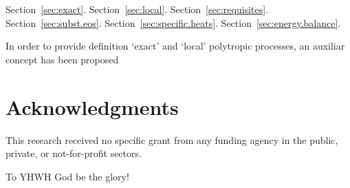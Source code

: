 \documentclass[fleqn,11pt]{SelfArx}
\newtheorem{theorem}{Theorem}
\newtheorem{definition}{Definition}
\newtheorem{conjecture}{Conjecture}
\newtheorem{proposition}{Proposition}
\begin{document}

    Section~\ref{sec:exact}.
    Section~\ref{sec:local}.
    Section~\ref{sec:requisites}.
    Section~\ref{sec:subst.eos}.
    Section~\ref{sec:specific.heats}.
    Section~\ref{sec:energy.balance}.

    In order to provide 
    definition `exact' and `local' polytropic processes, an auxiliar concept has been
    proposed

\section*{Acknowledgments}

    This research received no specific grant from any funding agency in the public, private,  or
    not-for-profit sectors.

    To YHWH God be the glory!





\end{document}
